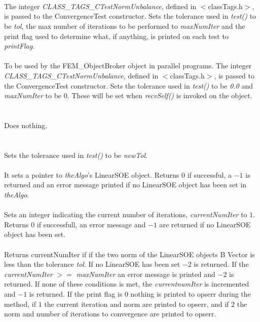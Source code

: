   \\
  \\ 
  \\
The integer {\em CLASS\_TAGS\_CTestNormUnbalance}, defined in
$<$classTags.h$>$, is passed to the ConvergenceTest constructor. 
Sets the tolerance used in {\em test()} to be {\em tol}, the max
number of iterations to be performed to {\em maxNumIter} and the print
flag used to determine what, if anything, is printed on each test to
{\em printFlag}. \\

  \\
To be used by the FEM\_ObjectBroker object in parallel programs. The
integer {\em CLASS\_TAGS\_CTestNormUnbalance}, defined in
$<$classTags.h$>$, is passed to the ConvergenceTest constructor. Sets
the tolerance used in {\em test()} to be {\em 0.0} and {\em maxNumIter} 
to be $0$. These will be set when {\em recvSelf()} is invoked on the object. \\

 \\
 \\ 
Does nothing. \\

  \\
 \\
Sets the tolerance used in {\em test()} to be {\em newTol}. \\

 \\
It sets a pointer to {\em theAlgo}'s LinearSOE object. Returns $0$ if
successful, a $-1$ is returned and an error message printed if no
LinearSOE object has been set in {\em theAlgo}. \\

 \\
Sets an integer indicating the current number of iterations, {\em
currentNumIter} to $1$. Returns $0$ if successfull, an error message
and $-1$ are returned if no LinearSOE object has been set. \\ 

 \\
Returns {currentNumIter} if if the two norm of the LinearSOE objects B
Vector is less than the tolerance {\em tol}. If no LinearSOE has been
set $-2$ is returned. If the {\em currentNumIter} $>=$ {\em
maxNumIter} an error message is printed and $-2$ is returned. If none
of these conditions is met, the {\em currentnumIter} is incremented 
and $-1$ is returned. If the print flag is $0$ nothing is printed to
opserr during the method, if $1$ the current iteration and norm are
printed to opserr, and if $2$ the norm and number of iterations to convergence
are printed to opserr. \\ 


